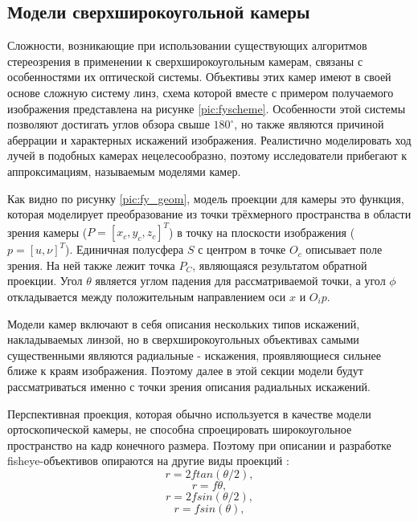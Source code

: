 \subsection{Модели сверхширокоугольной камеры}
\label{camera_model}
Сложности, возникающие при использовании существующих алгоритмов стереозрения  в применении к сверхширокоугольным камерам, связаны с
 особенностями их оптической системы. Объективы  этих камер имеют в своей основе сложную систему линз, схема которой вместе с примером
 получаемого изображения представлена на рисунке \ref{pic:fyscheme}. Особенности этой системы позволяют достигать углов обзора свыше $180^\circ$,
  но также являются причиной аберрации и характерных искажений изображения. Реалистично моделировать ход лучей в подобных камерах 
нецелесообразно, поэтому исследователи прибегают к аппроксимациям, называемым моделями камер.   %


Как видно по рисунку \ref{pic:fy_geom}, модель проекции для камеры это функция, которая моделирует преобразование 
из точки трёхмерного пространства  в области зрения камеры ($P=[x_c, y_c, z_c]^T$) в точку на плоскости изображения ($p=[u, \nu]^T$). Единичная            %
полусфера $S$ с центром в точке $O_c$ описывает поле зрения. На ней также лежит точка $P_C$, являющаяся результатом обратной проекции.    %
Угол $\theta$ является углом падения для рассматриваемой точки, а угол $\phi$ откладывается между положительным направлением оси $x$ и $O_{i}{p}$. 


Модели камер включают в себя описания нескольких типов искажений, накладываемых линзой, но в сверхширокоугольных объективах самыми существенными являются 
радиальные - искажения, проявляющиеся сильнее ближе к краям изображения. Поэтому далее в этой секции модели будут рассматриваться именно с точки зрения 
описания радиальных искажений. 


Перспективная проекция, которая обычно используется в качестве модели ортоскопической камеры, не способна спроецировать широкоугольное пространство на кадр 
конечного размера. Поэтому при описании и разработке fisheye-объективов опираются на другие виды проекций  \cite{projections}: 
\begin{equation}
    \label{fy1}
r = 2 f tan(\theta/2),  
\end{equation}
\begin{equation}
    \label{fy2}
r = f \theta,
\end{equation}
\begin{equation}
    \label{fy3}
r = 2 f sin(\theta/2),
\end{equation}
\begin{equation}
    \label{fy4}
r = f sin(\theta),
\end{equation}

